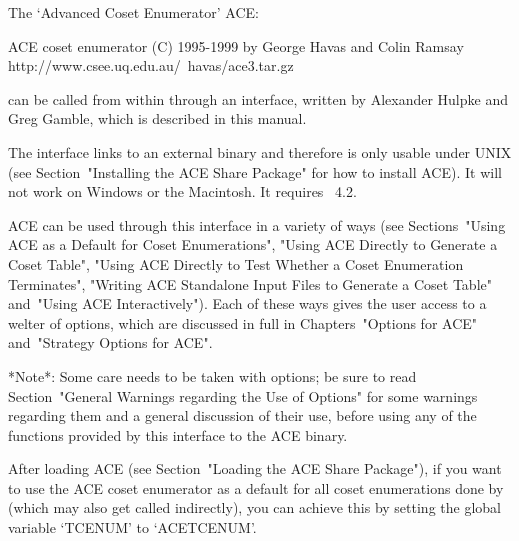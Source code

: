 
\def\ACE{{\sf ACE}}

The \lq{}Advanced Coset Enumerator' {\ACE}:

\begintt
ACE coset enumerator (C) 1995-1999 by George Havas and Colin Ramsay
    http://www.csee.uq.edu.au/~havas/ace3.tar.gz
\endtt

can  be called  from within  {\GAP} through  an interface,  written by
Alexander Hulpke and Greg Gamble, which is described in this manual.

The interface links to an external binary and therefore is only usable
under UNIX (see Section~"Installing the ACE Share Package" for how  to
install {\ACE}).  It will not work  on  Windows  or the Macintosh.  It
requires {\GAP}~4.2.

{\ACE} can be used through this interface in a variety  of  ways  (see
Sections~"Using ACE as a Default for Coset Enumerations",  "Using  ACE
Directly to Generate a Coset  Table",  "Using  ACE  Directly  to  Test
Whether a Coset Enumeration Terminates", "Writing ACE Standalone Input
Files to Generate a Coset Table" and~"Using ACE Interactively").  Each
of these ways gives the user access to a welter of options, which  are
discussed in full in Chapters~"Options for ACE" and~"Strategy  Options
for ACE". 

*Note*: Some care needs to be taken with  options;  be  sure  to  read
Section~"General Warnings regarding  the  Use  of  Options"  for  some
warnings regarding them and a general discussion of their use,  before
using any of the functions provided by this interface  to  the  {\ACE}
binary.


After loading  {\ACE}   (see Section~"Loading the ACE Share Package"),
if you  want to use the {\ACE}  coset enumerator as a  default for all
coset  enumerations  done  by   {\GAP}  (which  may  also  get  called
indirectly),  you can  achieve  this by  setting  the global  variable
`TCENUM' to `ACETCENUM'.

